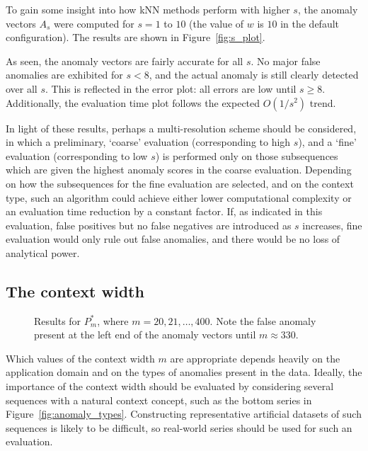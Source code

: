 To gain some insight into how kNN methods perform with higher $s$, the anomaly vectors $A_s$ were computed for $s = 1$ to $10$ (the value of $w$ is $10$ in the default configuration). The results are shown in Figure~\ref{fig:s_plot}.

As seen, the anomaly vectors are fairly accurate for all $s$. No major false anomalies are exhibited for $s < 8$, and the actual anomaly is still clearly detected over all $s$. This is reflected in the error plot: all errors are low until $s \geq 8$. Additionally, the evaluation time plot follows the expected $O(1/s^2)$ trend.

In light of these results, perhaps a multi-resolution scheme should be considered, in which a preliminary, `coarse' evaluation (corresponding to high $s$), and a `fine' evaluation (corresponding to low $s$) is performed only on those subsequences which are given the highest anomaly scores in the coarse evaluation. Depending on how the subsequences for the fine evaluation are selected, and on the context type, such an algorithm could achieve either lower computational complexity or an evaluation time reduction by a constant factor. If, as indicated in this evaluation, false positives but no false negatives are introduced as $s$ increases, fine evaluation would only rule out false anomalies, and there would be no loss of analytical power.

\subsection{The context width}
\label{sect:m}

\begin{figure}
    \centering
    \caption{Results for $P^*_m$, where $m = 20,21,\dots,400$. Note the false anomaly present at the left end of the anomaly vectors until $m \approx 330$.}
\label{fig:m_plot}
\end{figure}

Which values of the context width $m$ are appropriate depends heavily on the application domain and on the types of anomalies present in the data. Ideally, the importance of the context width should be evaluated by considering several sequences with a natural context concept, such as the bottom series in Figure~\ref{fig:anomaly_types}. Constructing representative artificial datasets of such sequences is likely to be difficult, so real-world series should be used for such an evaluation.

